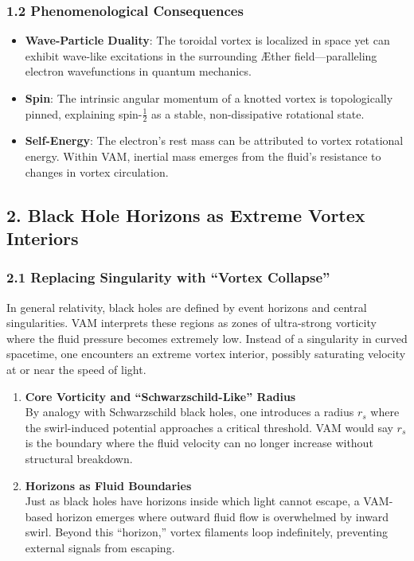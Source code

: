 \subsubsection*{1.2 Phenomenological Consequences}
\begin{itemize}
    \item \textbf{Wave-Particle Duality}: The toroidal vortex is localized in space yet can exhibit wave-like excitations in the surrounding Æther field—paralleling electron wavefunctions in quantum mechanics.
    \item \textbf{Spin}: The intrinsic angular momentum of a knotted vortex is topologically pinned, explaining spin-\(\tfrac{1}{2}\) as a stable, non-dissipative rotational state.
    \item \textbf{Self-Energy}: The electron’s rest mass can be attributed to vortex rotational energy. Within VAM, inertial mass emerges from the fluid’s resistance to changes in vortex circulation.
\end{itemize}


\subsection*{2. Black Hole Horizons as Extreme Vortex Interiors}

\subsubsection*{2.1 Replacing Singularity with “Vortex Collapse”}
In general relativity, black holes are defined by event horizons and central singularities. VAM interprets these regions as zones of ultra-strong vorticity where the fluid pressure becomes extremely low. Instead of a singularity in curved spacetime, one encounters an extreme vortex interior, possibly saturating velocity at or near the speed of light.

\begin{enumerate}
    \item \textbf{Core Vorticity and “Schwarzschild-Like” Radius} \\
    By analogy with Schwarzschild black holes, one introduces a radius \(r_s\) where the swirl-induced potential approaches a critical threshold. VAM would say \(r_s\) is the boundary where the fluid velocity can no longer increase without structural breakdown.
    \item \textbf{Horizons as Fluid Boundaries} \\
    Just as black holes have horizons inside which light cannot escape, a VAM-based horizon emerges where outward fluid flow is overwhelmed by inward swirl. Beyond this “horizon,” vortex filaments loop indefinitely, preventing external signals from escaping.
\end{enumerate}

